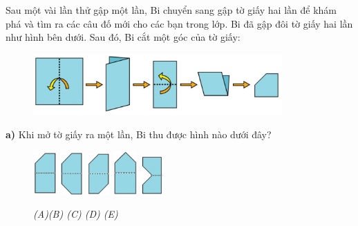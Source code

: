 Sau một vài lần thử gập một lần, Bi chuyển sang gập tờ giấy hai lần để khám phá và tìm ra các câu đố mới cho các bạn trong lớp.
\vskip 0.1cm
Bi đã gập đôi tờ giấy hai lần như hình bên dưới. Sau đó, Bi cắt một góc của tờ giấy: 
\begin{figure}[H]
	\captionsetup{labelformat=empty}
	\vspace*{5pt}
	\centering
	\captionsetup{justification=raggedleft}
	\includegraphics[width =0.85\textwidth]{cat-7a}
\end{figure}
\textbf{\color{toancuabi}a)} Khi mở tờ giấy ra một lần, Bi thu được hình nào dưới đây?
\begin{figure}[H]
	\centering
	\captionsetup{labelformat=empty}
	\vspace*{-4pt}
	\captionsetup{justification=centering}
	\includegraphics[width =0.08\textwidth]{cat-8a}
	\hfill
	\includegraphics[width =0.08\textwidth]{cat-8b}
	\hfill
	\includegraphics[width =0.08\textwidth]{cat-8c}
	\hfill
	\includegraphics[width =0.08\textwidth]{cat-8d}
	\hfill
	\includegraphics[width =0.08\textwidth]{cat-8e}	
	\caption{\small \it (A)\hfill (B) \hfill (C) \hfill (D) \hfill (E)}
	\vspace*{-10pt}
\end{figure}


